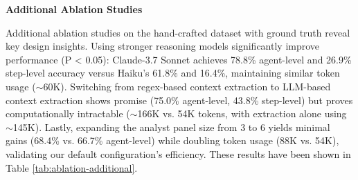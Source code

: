 \documentclass{article}
\begin{document}

\textbf{Additional Ablation Studies}

Additional ablation studies on the hand-crafted dataset with ground truth reveal key design insights. Using stronger reasoning models significantly improve performance (P < 0.05): Claude-3.7 Sonnet achieves 78.8\% agent-level and 26.9\% step-level accuracy versus Haiku's 61.8\% and 16.4\%, maintaining similar token usage ($\sim$60K). Switching from regex-based context extraction to LLM-based context extraction shows promise (75.0\% agent-level, 43.8\% step-level) but proves computationally intractable ($\sim$166K vs. 54K tokens, with extraction alone using $\sim$145K). Lastly, expanding the analyst panel size from 3 to 6 yields minimal gains (68.4\% vs. 66.7\% agent-level) while doubling token usage (88K vs. 54K), validating our default configuration's efficiency. These results have been shown in Table \ref{tab:ablation-additional}.
\end{document}
